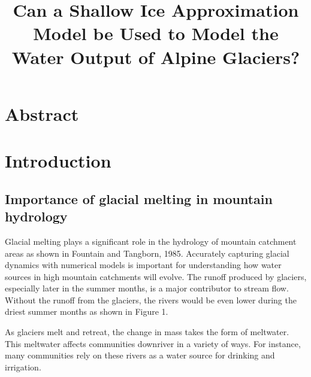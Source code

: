 \documentclass{article}
\title{Can a Shallow Ice Approximation Model be Used to Model the Water Output of Alpine Glaciers?}
\author{}
\date{}
\begin{document}
\maketitle

\section*{Abstract}

\section{Introduction}
\subsection{Importance of glacial melting in mountain hydrology}
Glacial melting plays a significant role in the hydrology of mountain catchment areas as shown in Fountain and Tangborn, 1985. Accurately 
capturing glacial dynamics with numerical models is important for understanding how water sources in high mountain catchments will evolve. 
The runoff produced by glaciers, especially later in the summer months, is a major contributor to stream flow. Without the runoff from the 
glaciers, the rivers would be even lower during the driest summer months as shown in Figure 1.

As glaciers melt and retreat, the change in mass takes the form of meltwater. This meltwater affects communities downriver in a variety of 
ways. For instance, many communities rely on these rivers as a water source for drinking and irrigation.  
\end{document}
